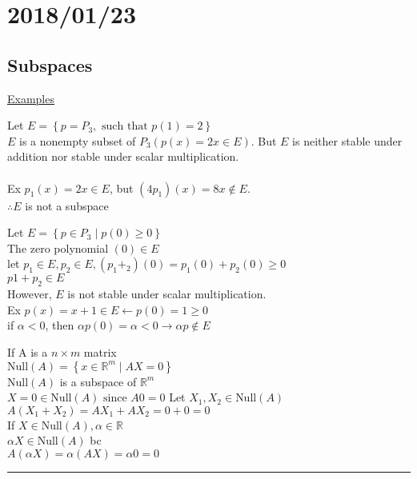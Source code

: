 \documentclass[12pt]{article}
\newcommand{\real}[0]{\mathbb{R}}
\newenvironment{proof}{\block[Proof]}{\endblock}
\newenvironment{examples}{\shownto{-,compact}\underline{Examples}\enumerate}{\endenumerate\divider\endshownto}
\newcommand{\bb}[1]{\left\{#1\right\}}
\newcommand{\divider}[0]{\par\textcolor{lightgray}{\rule{\textwidth}{0.1pt}}}
\begin{document}
	\section{2018/01/23}
	
	\subsection{Subspaces}
	
	\begin{examples}
		\item Let $E = \bb{p = P_3, \text{ such that } p(1) = 2}$ \\
		$E$ is a nonempty subset of $P_3 (p(x) = 2x \in E)$. But $E$ is neither stable under addition nor stable under scalar multiplication. \\\\
		Ex $p_1(x) = 2x \in E$, but $(4p_1)(x) = 8x \notin E$. \\
		$\therefore E$ is not a subspace 
		
		\item Let $E = \bb{p \in P_3 \mid p(0) \ge 0}$ \\
		The zero polynomial $(0) \in E$ \\
		let $p_1 \in E, p_2 \in E, (p_1 + _2)(0) = p_1(0) + p_2(0) \ge 0$ \\
		$p1 + p_2 \in E$ \\
		However, $E$ is not stable under scalar multiplication. \\
		Ex $p(x) = x + 1 \in E \leftarrow p(0) = 1 \ge 0$ \\
		if $\alpha < 0$, then $\alpha p(0) = \alpha < 0 \rightarrow \alpha p \notin E$
		
		\item If A is a $n \times m$ matrix \\
		$\text{Null}(A) = \bb{x \in \real^m \mid AX = 0}$ \\
		$\text{Null}(A)$ is a subspace of $\real^m$ \\
		\begin{proof}
			$X = 0 \in \text{Null}(A) \text{ since } A0 = 0$
			Let $X_1, X_2 \in \text{Null}(A)$ \\
			$A(X_1 + X_2) = AX_1 + AX_2 = 0 + 0 = 0$ \\
			If $X \in \text{Null}(A), \alpha \in \real$ \\
			$\alpha X \in \text{Null}(A)$ bc \\
			$A(\alpha X) = \alpha (AX) = \alpha 0 = 0$
		\end{proof}
	\end{examples}
	
\end{document}

